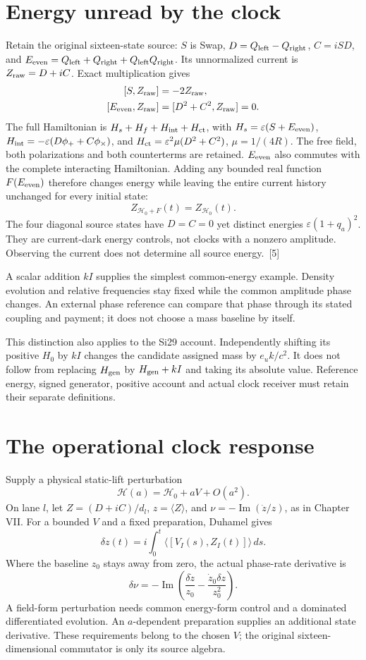 \documentclass[10pt,twocolumn,letterpaper]{article}
\begin{document}
\section{Energy unread by the clock}
Retain the original sixteen-state source: $S$ is Swap, $D=Q_{\rm left}-Q_{\rm right}$, $C=iSD$, and $E_{\rm even}=Q_{\rm left}+Q_{\rm right}+Q_{\rm left}Q_{\rm right}$. Its unnormalized current is $Z_{\rm raw}=D+iC$. Exact multiplication gives
\[
\begin{aligned}
[S,Z_{\rm raw}]&=-2Z_{\rm raw},\\
[E_{\rm even},Z_{\rm raw}]&=[D^2+C^2,Z_{\rm raw}]=0.
\end{aligned}
\]
The full Hamiltonian is $H_s+H_f+H_{\rm int}+H_{\rm ct}$, with $H_s=\varepsilon(S+E_{\rm even})$, $H_{\rm int}=-\varepsilon(D\phi_++C\phi_\times)$, and $H_{\rm ct}=\varepsilon^2\mu(D^2+C^2)$, $\mu=1/(4R)$. The free field, both polarizations and both counterterms are retained. $E_{\rm even}$ also commutes with the complete interacting Hamiltonian. Adding any bounded real function $F(E_{\rm even})$ therefore changes energy while leaving the entire current history unchanged for every initial state:
\[
Z_{\mathcal H_0+F}(t)=Z_{\mathcal H_0}(t).
\]
The four diagonal source states have $D=C=0$ yet distinct energies $\varepsilon(1+q_a)^2$. They are current-dark energy controls, not clocks with a nonzero amplitude. Observing the current does not determine all source energy.~[5]

A scalar addition $kI$ supplies the simplest common-energy example. Density evolution and relative frequencies stay fixed while the common amplitude phase changes. An external phase reference can compare that phase through its stated coupling and payment; it does not choose a mass baseline by itself.

This distinction also applies to the Si29 account. Independently shifting its positive $H_0$ by $kI$ changes the candidate assigned mass by $e_uk/c^2$. It does not follow from replacing $H_{\rm gen}$ by $H_{\rm gen}+kI$ and taking its absolute value. Reference energy, signed generator, positive account and actual clock receiver must retain their separate definitions.

\section{The operational clock response}
Supply a physical static-lift perturbation
\[
\mathcal H(a)=\mathcal H_0+aV+O(a^2).
\]
On lane $l$, let $Z=(D+iC)/d_l$, $z=\langle Z\rangle$, and $\nu=-\operatorname{Im}(\dot z/z)$, as in Chapter VII. For a bounded $V$ and a fixed preparation, Duhamel gives
\[
\delta z(t)=i\int_0^t\langle[V_I(s),Z_I(t)]\rangle\,ds.
\]
Where the baseline $z_0$ stays away from zero, the actual phase-rate derivative is
\[
\delta\nu=-\operatorname{Im}\left(\frac{\delta\dot z}{z_0}-\frac{\dot z_0\delta z}{z_0^2}\right).
\]
A field-form perturbation needs common energy-form control and a dominated differentiated evolution. An $a$-dependent preparation supplies an additional state derivative. These requirements belong to the chosen $V$; the original sixteen-dimensional commutator is only its source algebra.
\end{document}
